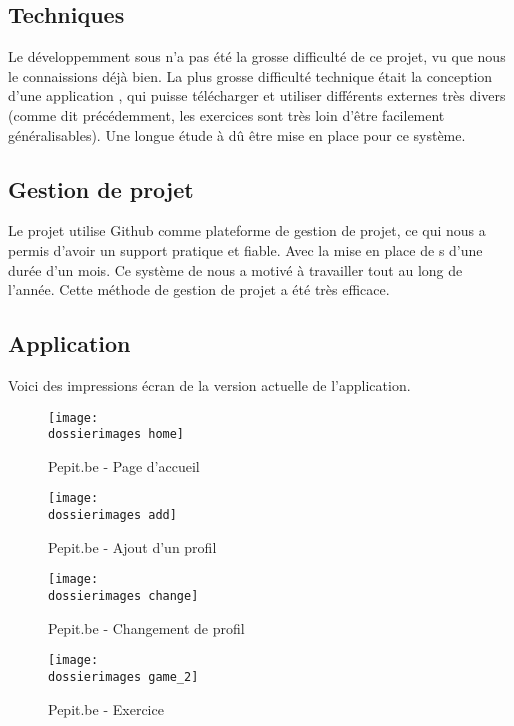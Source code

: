 \subsection{Techniques}
Le développemment sous \android{} n'a pas été la grosse difficulté de ce projet, vu que nous le connaissions déjà bien. La plus grosse difficulté technique était la conception d'une application \android{}, qui puisse télécharger et utiliser différents \plugins{} externes très divers (comme dit précédemment, les exercices sont très loin d'être facilement généralisables). Une longue étude à dû être mise en place pour ce système. 

\subsection{Gestion de projet}
Le projet utilise Github comme plateforme de gestion de projet, ce qui nous a permis d'avoir un support pratique et fiable.
Avec la mise en place de \sprint s d'une durée d'un mois. Ce système de \sprint{} nous a motivé à travailler tout au long de l'année. Cette méthode de gestion de projet a été très efficace.


\subsection{Application}
Voici des impressions écran de la version actuelle de l'application.
\begin{figure}[H]
   	\begin{minipage}[c]{.46\linewidth}
		\texttt{[image: \\dossierimages home]} 
		\caption{Pepit.be - Page d'accueil}
		\label{Pepit.be - Page d'accueil}
   	\end{minipage} \hfill
  	\begin{minipage}[c]{.46\linewidth}
      	\texttt{[image: \\dossierimages add]}
     	\caption{Pepit.be - Ajout d'un profil}
		\label{Pepit.be - Ajout d'un profil}
   	\end{minipage}
\end{figure}
\begin{figure}[H]
   	\begin{minipage}[c]{.46\linewidth}
		\texttt{[image: \\dossierimages change]} 
		\caption{Pepit.be - Changement de profil}
		\label{Pepit.be - Changement de profil}
   	\end{minipage} \hfill
  	\begin{minipage}[c]{.46\linewidth}
      	\texttt{[image: \\dossierimages game\_2]}
     	\caption{Pepit.be - Exercice}
		\label{Pepit.be - Exercice}
   	\end{minipage}
\end{figure}

